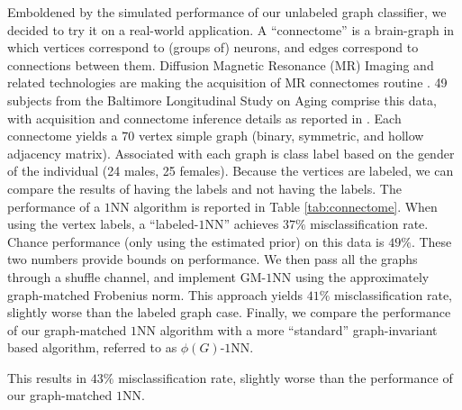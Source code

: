 Emboldened by the simulated performance of our unlabeled graph classifier, we decided to try it on a real-world application.  
A ``connectome'' is a brain-graph in which vertices correspond to (groups of) neurons, and edges correspond to connections between them.  Diffusion Magnetic Resonance (MR) Imaging and related technologies are making the acquisition of MR connectomes routine \cite{Hagmann2010}.  49 subjects from the Baltimore Longitudinal Study on Aging comprise this data, with acquisition and connectome inference details as reported in \cite{Gray11}.  Each connectome yields a $70$ vertex simple graph (binary, symmetric, and hollow adjacency matrix).  Associated with each graph is class label based on the gender of the individual (24 males, 25 females).  Because the vertices are labeled, we can compare the results of having the labels and not having the labels.  The performance of a $1$NN algorithm is reported in Table \ref{tab:connectome}. When using the vertex labels, a ``labeled-$1$NN'' achieves $37\%$ misclassification rate.  Chance performance (only using the estimated prior) on this data is $49\%$.  These two numbers provide bounds on performance.  We then pass all the graphs through a shuffle channel, and implement GM-$1$NN using the approximately graph-matched Frobenius norm.  This approach yields $41\%$ misclassification rate, slightly worse than the labeled graph case.  Finally, we compare the performance of our graph-matched $1$NN algorithm with a more ``standard'' graph-invariant based algorithm, referred to as $\phi(G)$-$1$NN.  

 This results in $43\%$ misclassification rate, slightly worse than the performance of our graph-matched $1$NN.  





